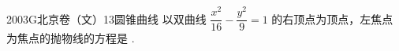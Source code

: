 
\begin{problem}{2003}{G}{北京卷（文）}{13}{圆锥曲线}
以双曲线 $ \dfrac{x^2}{16}-\dfrac{y^2}{9}=1 $ 的右顶点为顶点，左焦点为焦点的抛物线的方程是 \underline{\hspace{4em}}.
\end{problem}

\begin{answer}

\end{answer}

\begin{solutions}

\end{solutions}